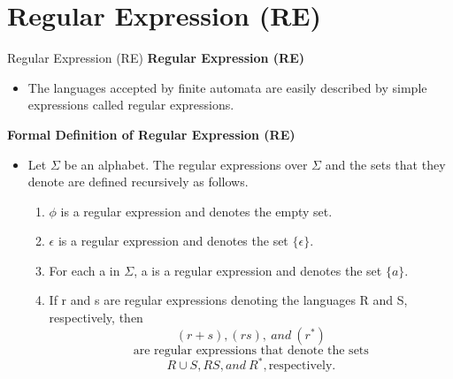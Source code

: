 \documentclass{beamer}
\begin{document}
\section{Regular Expression (RE)}
\begin{frame}{Regular Expression (RE)}
	\textbf{Regular Expression (RE)}
	\begin{itemize}
		\item The languages accepted by finite automata are easily described by simple 
		expressions called regular expressions.
	\end{itemize} 
	\textbf{Formal Definition of Regular Expression (RE)}
		\begin{itemize}
		\item Let $\Sigma$ be an alphabet. The regular expressions over $\Sigma$ and the sets that they denote are defined recursively as follows.
		\begin{enumerate}
			\item $\phi$ is a regular expression and denotes the empty set. 
			\item $\epsilon$ is a regular expression and denotes the set $\{\epsilon\}$. 
			\item For each a in $\Sigma$, a is a regular expression and denotes the set $\{a\}$.
			\item If r and s are regular expressions denoting the languages R and S, 
			respectively, then
			$$(r + s), (rs),\  and\  (r^*)$$
			$$ \mbox{are regular expressions that denote the sets} $$
			$$ R \cup S, RS, and\  R^*, \mbox{respectively}.
$$ 
		\end{enumerate}
	\end{itemize}
\end{frame}
\end{document}
